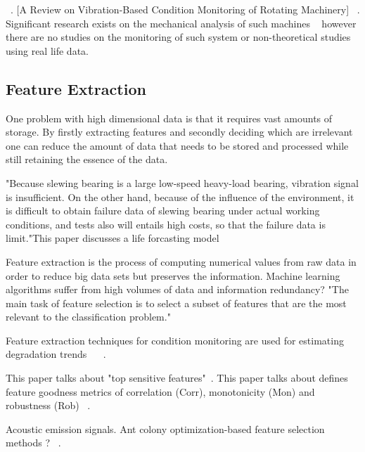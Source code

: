 \documentclass[]{article}
\begin{document}
~\cite{soualhi2021novel}.
[A Review on Vibration-Based Condition Monitoring of Rotating Machinery]
~\cite{yoshimura2009effect}. 
Significant research exists on the mechanical analysis of such machines ~\cite{kato2014straightening, ma2020effect, ma2021analysis, yu2018theoretical, das1991mechanics} however there are no studies on the monitoring of such system or non-theoretical studies using real life data.

\subsection{Feature Extraction}

One problem with high dimensional data is that it requires vast amounts of storage. By firstly extracting features and secondly deciding which are irrelevant one can reduce the amount of data that needs to be stored and processed while still retaining the essence of the data.

"Because slewing bearing is a large low-speed heavy-load bearing, vibration signal is insufficient. On the other hand, because of the influence of the
environment, it is difficult to obtain failure data of slewing bearing under actual working conditions, and tests also will entails high costs, so that the failure data is limit."This paper discusses a life forcasting model~\cite{wang2016multiple}

Feature extraction is the process of computing numerical values from raw data in order to reduce big data sets but preserves the information. Machine learning algorithms suffer from high volumes of data and information redundancy?
"The main task of feature selection is to select a subset of features that are the most relevant to the classification problem." ~\cite{ahmed2020condition}

Feature extraction techniques for condition monitoring are used for estimating degradation trends ~\cite{caesarendra2017review} ~\cite{adams2017comparison}.

This paper talks about "top sensitive features"~\cite{bleakie2013feature}.
This paper talks about defines feature goodness metrics of correlation (Corr), monotonicity (Mon) and robustness (Rob) ~\cite{zhang2016degradation}.

Acoustic emission signals. Ant colony optimization-based feature selection methods ? ~\cite{liao2010feature}.
\end{document}
